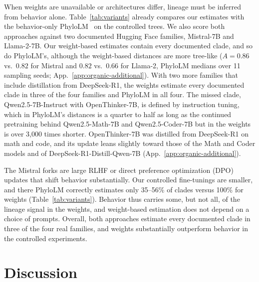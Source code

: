 \documentclass{article}
\theoremstyle{definition}
\theoremstyle{plain}
\newif\ifrevision
\newcommand{\rev}[1]{\ifrevision{\color{blue}#1}\else#1\fi}
\newcommand{\revtag}[1]{\ifrevision\textsuperscript{\color{blue}\sffamily\scriptsize[#1]}\fi}
\begin{document}
When weights are unavailable or architectures differ, lineage must be inferred from behavior alone. Table~\ref{tab:variants} already compares our estimates with the behavior-only PhyloLM~\citep{yax2025phylolm} on the controlled trees. We also score both approaches against two documented Hugging Face families, Mistral-7B and Llama-2-7B. Our weight-based estimates contain every documented clade, and so do PhyloLM's, although the weight-based distances are more tree-like ($A=0.86$ vs.\ \rev{$0.82$} for Mistral and $0.82$ vs.\ \rev{$0.66$} for Llama-2\rev{, PhyloLM medians over 11 sampling seeds}; App.~\ref{app:organic-additional})\revtag{Corr.}. \rev{With two more families that include distillation from DeepSeek-R1, the weights estimate every documented clade in three of the four families and PhyloLM in all four. The missed clade, Qwen2.5-7B-Instruct with OpenThinker-7B, is defined by instruction tuning, which in PhyloLM's distances is a quarter to half as long as the continued pretraining behind Qwen2.5-Math-7B and Qwen2.5-Coder-7B but in the weights is over 3,000 times shorter. OpenThinker-7B was distilled from DeepSeek-R1 on math and code, and its update leans slightly toward those of the Math and Coder models and of DeepSeek-R1-Distill-Qwen-7B (App.~\ref{app:organic-additional}).}\revtag{S8sV}

The Mistral forks are large RLHF or direct preference optimization (DPO) updates that shift behavior substantially. Our controlled fine-tunings are smaller, and there PhyloLM correctly estimates only 35--56\% of clades versus 100\% for weights (Table~\ref{tab:variants}). Behavior thus carries some, but not all, of the lineage signal in the weights, and weight-based estimation does not depend on a choice of prompts. Overall, both approaches estimate every documented clade in \rev{three of the four}\revtag{S8sV} real families, and weights substantially outperform behavior in the controlled experiments.

\section{Discussion}
\label{sec:discussion}
\end{document}
